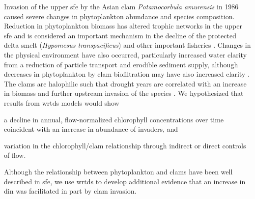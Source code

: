 \documentclass[journal = esthag, manuscript = article]{achemso}\usepackage[]{graphicx}\usepackage[]{color}
\begin{document}
Invasion of the upper \ac{sfe} by the Asian clam \textit{Potamocorbula amurensis} in 1986 caused severe changes in phytoplankton abundance and species composition.  Reduction in phytoplankton biomass has altered trophic networks in the upper \ac{sfe} and is considered an important mechanism in the decline of the protected delta smelt (\textit{Hypomesus transpacificus}) and other important fisheries \cite{Feyrer03,MacNally10}.  Changes in the physical environment have also occurred, particularly increased water clarity from a reduction of particle transport and erodible sediment supply,\cite{Jassby08,Schoellhamer11,Cloern12b} although decreases in phytoplankton by clam biofiltration may have also increased clarity \cite{MacNally10}. The clams are halophilic such that drought years are correlated with an increase in biomass and further upstream invasion of the species \cite{Parchaso02,Cloern12b}. We hypothesized that results from \ac{wrtds} models would show \begin{inparaenum}[1\upshape)]
\item a decline in annual, flow-normalized chlorophyll concentrations over time coincident with an increase in abundance of invaders, and
\item variation in the chlorophyll/clam relationship through indirect or direct controls of flow.
\end{inparaenum}
Although the relationship between phytoplankton and clams have been well described in \ac{sfe}\cite{Kimmerer14}, we use \ac{wrtds} to develop additional evidence that an increase in \ac{din} was facilitated in part by clam invasion.
\end{document}

